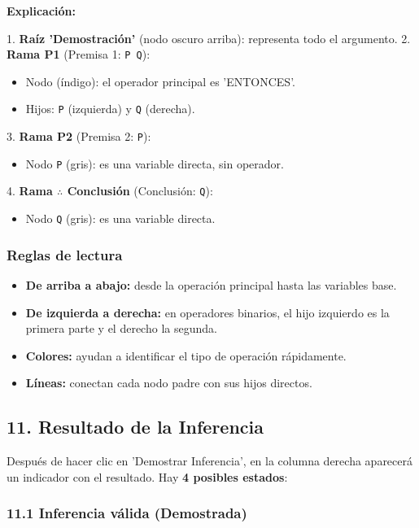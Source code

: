 \documentclass[11pt,a4paper]{article}
\begin{document}
\textbf{Explicación:}

1. \textbf{Raíz 'Demostración'} (nodo oscuro arriba): representa todo el argumento.
2. \textbf{Rama P1} (Premisa 1: \texttt{P  Q}):
\begin{itemize}[leftmargin=*]
\item Nodo \texttt{} (índigo): el operador principal es 'ENTONCES'.
\item Hijos: \texttt{P} (izquierda) y \texttt{Q} (derecha).
\end{itemize}
3. \textbf{Rama P2} (Premisa 2: \texttt{P}):
\begin{itemize}[leftmargin=*]
\item Nodo \texttt{P} (gris): es una variable directa, sin operador.
\end{itemize}
4. \textbf{Rama $ \therefore $ Conclusión} (Conclusión: \texttt{Q}):
\begin{itemize}[leftmargin=*]
\item Nodo \texttt{Q} (gris): es una variable directa.
\end{itemize}

\subsubsection{Reglas de lectura}

\begin{itemize}[leftmargin=*]
\item \textbf{De arriba a abajo:} desde la operación principal hasta las variables base.
\item \textbf{De izquierda a derecha:} en operadores binarios, el hijo izquierdo es la primera parte y el derecho la segunda.
\item \textbf{Colores:} ayudan a identificar el tipo de operación rápidamente.
\item \textbf{Líneas:} conectan cada nodo padre con sus hijos directos.
\end{itemize}

\hrulefill

\subsection{11. Resultado de la Inferencia}

Después de hacer clic en 'Demostrar Inferencia', en la columna derecha aparecerá un indicador con el resultado. Hay \textbf{4 posibles estados}:

\subsubsection{11.1 Inferencia válida (Demostrada)}
\end{document}
